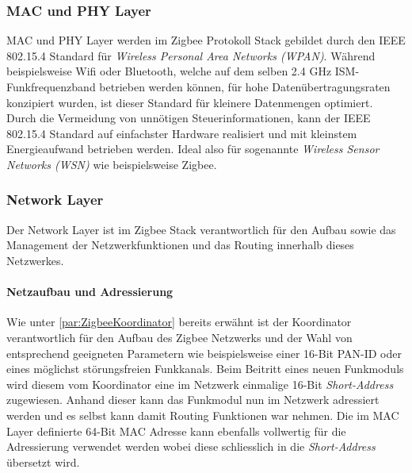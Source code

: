 \subsubsection{MAC und PHY Layer}\label{subsubsec:MACundPHYLayer}
MAC und PHY Layer werden im Zigbee Protokoll Stack gebildet durch den IEEE 802.15.4 Standard für \textit{Wireless Personal Area Networks (WPAN)}.
Während beispielsweise Wifi oder Bluetooth, welche auf dem selben 2.4 GHz ISM-Funkfrequenzband betrieben werden können, für hohe Datenübertragungsraten konzipiert wurden, ist dieser Standard für kleinere Datenmengen optimiert.
Durch die Vermeidung von unnötigen Steuerinformationen, kann der IEEE 802.15.4 Standard auf einfachster Hardware realisiert und mit kleinstem Energieaufwand betrieben werden.
Ideal also für sogenannte \textit{Wireless Sensor Networks (WSN)} wie beispielsweise Zigbee. \cite{markus_krause_rainer_konrad_ieee_2014}


\subsubsection{Network Layer}\label{subsubsec:Network Layer}
Der Network Layer ist im Zigbee Stack verantwortlich für den Aufbau sowie das Management der Netzwerkfunktionen und das Routing innerhalb dieses Netzwerkes.

\paragraph{Netzaufbau und Adressierung}\label{par:ZigbeeNetzaufbauundAdressierung}
Wie unter \ref{par:ZigbeeKoordinator} bereits erwähnt ist der Koordinator verantwortlich für den Aufbau des Zigbee Netzwerks und der Wahl von entsprechend geeigneten Parametern wie beispielsweise einer 16-Bit PAN-ID oder eines möglichst störungsfreien Funkkanals.
Beim Beitritt eines neuen Funkmoduls wird diesem vom Koordinator eine im Netzwerk einmalige 16-Bit \textit{Short-Address} zugewiesen.
Anhand dieser kann das Funkmodul nun im Netzwerk adressiert werden und es selbst kann damit Routing Funktionen war nehmen.
Die im MAC Layer definierte 64-Bit MAC Adresse kann ebenfalls vollwertig für die Adressierung verwendet werden wobei diese schliesslich in die \textit{Short-Address} übersetzt wird.


